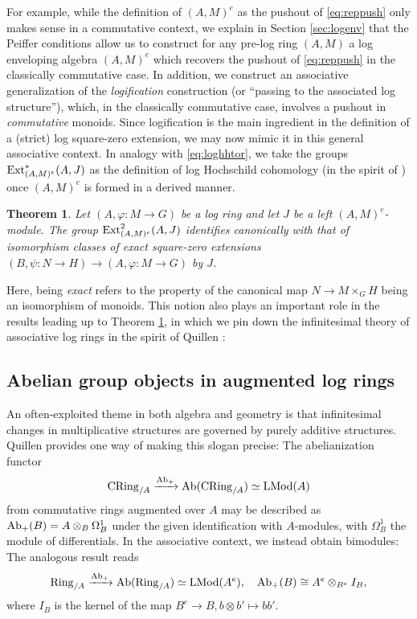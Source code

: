 \documentclass[a4paper,10pt%
]{amsart}
\numberwithin{equation}{section}
\newtheorem{theorem}[subsection]{Theorem}
\theoremstyle{definition}
\renewcommand{\:}{\colon}
\begin{document}
For example, while the definition of $(A, M)^e$ as the pushout of \eqref{eq:reppush} only makes sense in a commutative context, we explain in Section \ref{sec:logenv} that the Peiffer conditions allow us to construct for any pre-log ring $(A, M)$ a log enveloping algebra $(A, M)^e$ which recovers the pushout of \eqref{eq:reppush} in the classically commutative case. In addition, we construct an associative generalization of the \emph{logification} construction (or ``passing to the associated log structure''), which, in the classically commutative case, involves a pushout in \emph{commutative} monoids. Since logification is the main ingredient in the definition of a (strict) log square-zero extension, we may now mimic it in this general associative context. In analogy with \eqref{eq:loghhtor}, we take the groups ${\rm Ext}_{(A, M)^e}^*(A, J)$ as the definition of log Hochschild cohomology (in the spirit of \cites{HHL26a, HHL26b, GHH26}) once $(A, M)^e$ is formed in a derived manner. 

\begin{theorem}\label{thm:loghch} Let $(A, \varphi \colon M \to G)$ be a log ring and let $J$ be a left $(A, M)^e$-module. The group ${\rm Ext}^2_{(A, M)^e}(A, J)$ identifies canonically with that of isomorphism classes of exact square-zero extensions $(B, \psi \colon N \to H) \to (A, \varphi \colon M \to G)$ by $J$. 
\end{theorem}

Here, being \emph{exact} refers to the property of the canonical map $N \to M \times_G H$ being an isomorphism of monoids. This notion also plays an important role in the results leading up to Theorem \ref{thm:loghch}, in which we pin down the infinitesimal theory of associative log rings in the spirit of Quillen \cite{Qui70}: 

\subsection{Abelian group objects in augmented log rings} An often-exploited theme in both algebra and geometry is that infinitesimal changes in multiplicative structures are governed by purely additive structures. Quillen \cite{Qui70} provides one way of making this slogan precise: The abelianization functor \begin{equation}\label{eq:quillenab}{\rm CRing}_{/A} \xrightarrow{{\rm Ab}_+} {\rm Ab}({\rm CRing}_{/A}) \simeq {\rm LMod}(A)\end{equation} from commutative rings augmented over $A$ may be described as ${\rm Ab}_+(B) = A \otimes_B \Omega^1_B$ under the given identification with $A$-modules, with $\Omega^1_B$ the module of differentials. In the associative context, we instead obtain bimodules: The analogous result reads \[{\rm Ring}_{/A} \xrightarrow{{\rm Ab}_+} {\rm Ab}({\rm Ring}_{/A}) \simeq {\rm LMod}(A^e), \quad {\rm Ab}_+(B) \cong A^e \otimes_{B^e} I_{B},\] where $I_{B}$ is the kernel of the map $B^e \to B, b \otimes b' \mapsto bb'$. 
\end{document}
